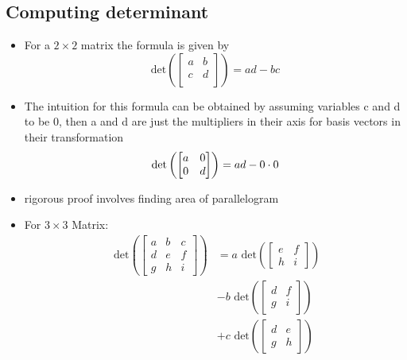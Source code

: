 \documentclass[a4paper]{article}
\begin{document}
\subsection{Computing determinant}
\begin{itemize}
	\item For a $2 \times 2$ matrix the formula is given by
	      \[
		      \text{det}\left(
		      \begin{bmatrix} a & b \\
                c & d \\\end{bmatrix}  \right)
		      = a d - b c
	      \]
	\item The intuition for this formula can be
	      obtained by assuming variables c and d to be 0,
	      then a and d are just the multipliers in
	      their axis for basis vectors in their
	      transformation
	      \[
		      \text{det}\left( \begin{bmatrix}
				      a & 0 \\
				      0 & d \\\end{bmatrix}  \right)
		      = a d - 0 \cdot 0 \\
	      \]
	\item rigorous proof involves finding area of
	      parallelogram
	\item For $3 \times 3$ Matrix:
	      \begin{align*}
		      \text{ det}\left(
		      \begin{bmatrix}
				      a & b & c \\
				      d & e & f \\
				      g & h & i\end{bmatrix}
		      \right)
		       & = a \text{ det}\left(
		      \begin{bmatrix}
				      e & f \\
				      h & i\end{bmatrix}
		      \right)                  \\
		       & - b \text{ det}\left(
		      \begin{bmatrix}
				      d & f \\
				      g & i\end{bmatrix}
		      \right)                  \\
		       & + c \text{ det}\left(
		      \begin{bmatrix}
				      d & e \\
				      g & h\end{bmatrix}
		      \right)                  \\
	      \end{align*}
\end{itemize}
\end{document}
